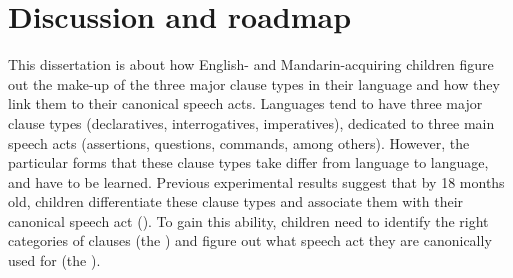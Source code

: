 \section{Discussion and roadmap}
\label{sec:intro:roadmap} 
This dissertation is about how English- and Mandarin-acquiring children figure out the make-up of the three major clause types in their language and how they link them to their canonical speech acts. Languages tend to have three major clause types (declaratives, interrogatives, imperatives), dedicated to three main speech acts (assertions, questions, commands, \cite{sz1985speechact} among others). However, the particular forms that these clause types take differ from language to language, and have to be learned. Previous experimental results suggest that by 18 months old, children differentiate these clause types and associate them with their canonical speech act (\cite{geffenmintz2011,geffenmintz2015wordorder,casillas2017turn,perkins2019,marshmallowqueen}). To gain this ability, children need to identify the right categories of clauses (the ) and figure out what speech act they are canonically used for (the ). 

